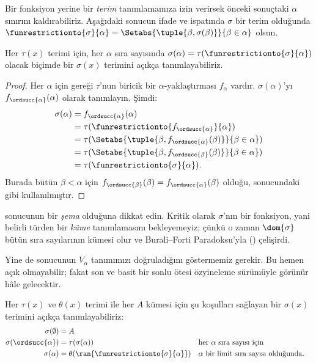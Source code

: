 Bir fonksiyon yerine bir \emph{terim} tanımlamamıza izin verirsek önceki
sonuçtaki $\alpha$ sınırını kaldırabiliriz. Aşağıdaki sonucun ifade ve
ispatında $\sigma$ bir terim olduğunda
$\funrestrictionto{\sigma}{\alpha}=
\Setabs{\tuple{\beta,\sigma(\beta)}}{\beta\in\alpha}$ olsun.

\begin{thm}
Her $\tau(x)$ terimi için, her $\alpha$ sıra sayısında
$\sigma(\alpha)=\tau(\funrestrictionto{\sigma}{\alpha})$ olacak biçimde
bir $\sigma(x)$ terimini açıkça tanımlayabiliriz.
\end{thm}

\begin{proof}
Her $\alpha$ için  gereği $\tau$'nun biricik bir
$\alpha$-yaklaştırması $f_\alpha$ vardır. $\sigma(\alpha)$'yı
$f_{\ordsucc{\alpha}}(\alpha)$ olarak tanımlayın. Şimdi:
	\begin{align*}
		\sigma(\alpha) &=
		f_{\ordsucc{\alpha}}(\alpha) \\&=
		\tau(\funrestrictionto{f_{\ordsucc{\alpha}}}{\alpha}) \\&=
		\tau(\Setabs{\tuple{\beta, f_{\ordsucc{\alpha}}(\beta)}}{\beta \in \alpha}) \\&=
		\tau(\Setabs{\tuple{\beta, f_{\ordsucc{\beta}}(\beta)}}{\beta \in \alpha})\\&=
		\tau(\funrestrictionto{\sigma}{\alpha}).
	\end{align*}
Burada bütün $\beta<\alpha$ için
$f_{\ordsucc{\beta}}(\beta)=f_{\ordsucc{\alpha}}(\beta)$ olduğu,
 sonucundaki gibi kullanılmıştır.
\end{proof}
\noindent
{} sonucunun bir \emph{şema} olduğuna dikkat
edin. Kritik olarak $\sigma$'nın bir fonksiyon, yani belirli türden bir
\emph{küme} tanımlamasını bekleyemeyiz; çünkü o zaman $\dom{\sigma}$ bütün
sıra sayılarının kümesi olur ve Burali--Forti Paradoksu'yla
() çelişirdi.

Yine de  sonucunun $V_\alpha$ tanımımızı
doğruladığını göstermemiz gerekir. Bu hemen açık olmayabilir; fakat son ve
basit bir sonlu ötesi özyineleme sürümüyle görünür hâle gelecektir.

\begin{thm}
Her $\tau(x)$ ve $\theta(x)$ terimi ile her $A$ kümesi için şu koşulları
sağlayan bir $\sigma(x)$ terimini açıkça tanımlayabiliriz:
\begin{align*}
	\sigma(\emptyset) &= A\\
	\sigma(\ordsucc{\alpha}) &= \tau(\sigma(\alpha)) &&
		\text{her $\alpha$ sıra sayısı için}\\
	\sigma(\alpha) &= \theta(\ran{\funrestrictionto{\sigma}{\alpha}})&&
	\text{$\alpha$ bir limit sıra sayısı olduğunda.}
\end{align*}
\end{thm}

